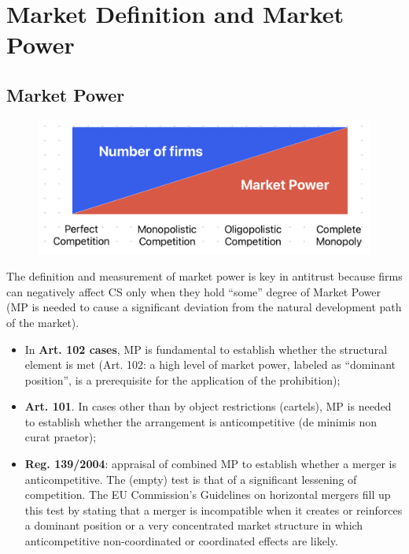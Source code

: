 \setcounter{chapter}{3}
\chapter{Market Definition and Market Power}
\vspace{-1.5cm}

{\chaptoc\noindent\begin{minipage}[inner sep=0,outer sep=0]{0.9\linewidth}\section{Market Power}\end{minipage}}

    \begin{figure}[h]
        \centering
        \includegraphics[width=0.5\linewidth]{graphics/L4-1_market_power.png}
    \end{figure}

    The definition and measurement of market power is key in antitrust because firms can negatively affect CS only when they hold “some” degree of Market Power (MP is needed to cause a significant deviation from the natural development path of the market).
    \begin{itemize}
        \item In \textbf{Art. 102 cases}, MP is fundamental to establish whether the structural element is met (Art. 102: a high level of market power, labeled as “dominant position”, is a prerequisite for the application of the prohibition);
        \item \textbf{Art. 101}. In cases other than by object restrictions (cartels), MP is needed to establish whether the arrangement is anticompetitive (de minimis non curat praetor);
        \item \textbf{Reg. 139/2004}: appraisal of combined MP to establish whether a merger is anticompetitive. The (empty) test is that of a significant lessening of competition. The EU Commission’s Guidelines on horizontal mergers fill up this test by stating that a merger is incompatible when it creates or reinforces a dominant position or a very concentrated market structure in which anticompetitive non-coordinated or coordinated effects are likely.
    \end{itemize}

